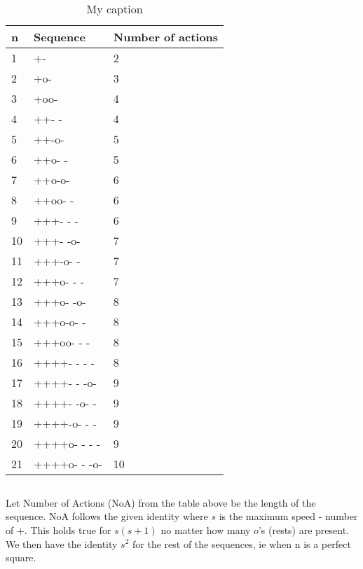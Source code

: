 \documentclass[12pt]{article}
\begin{document}
\subsection{}
\begin{table}[h]
\centering
\caption{My caption}
\label{my-label}
\begin{tabular}{|l|l|l|}
\hline
n  & Sequence & Number of actions \\ \hline
1  &  +-      & 2                 \\ \hline
2  &  +o-    & 3                  \\ \hline
3  &  +oo-    & 4                   \\ \hline
4  &  ++- -    & 4                  \\ \hline
5  &  ++-o-   & 5                  \\ \hline
6  &  ++o- -   & 5                  \\ \hline
7  &  ++o-o-  & 6         \\ \hline
8  &  ++oo- -  & 6                  \\ \hline
9  &  +++- - -  & 6                  \\ \hline
10 &  +++- -o- & 7                  \\ \hline
11 &  +++-o- - & 7                  \\ \hline
12 &  +++o- - -  & 7                  \\ \hline
13 &  +++o- -o-  & 8                  \\ \hline
14 &  +++o-o- -  & 8                  \\ \hline
15 &  +++oo- - -  & 8                  \\ \hline
16 &  ++++- - - -  & 8                  \\ \hline
17 &  ++++- - -o-         & 9                  \\ \hline
18 &  ++++- -o- -        & 9                  \\ \hline
19 &  ++++-o- - -         & 9                  \\ \hline
20 &  ++++o- - - -         & 9                  \\ \hline
21 &  ++++o- - -o-        & 10                  \\ \hline
\end{tabular}
\end{table}
\subsection{}
Let Number of Actions (NoA) from the table above be the length of the sequence. NoA follows the given identity where $s$ is the maximum speed - number of $+$. This holds true for $s(s+1)$ no matter how many $o$'s (rests) are present. We then have the identity $s^2$ for the rest of the sequences, ie when n is a perfect square.
\end{document}
